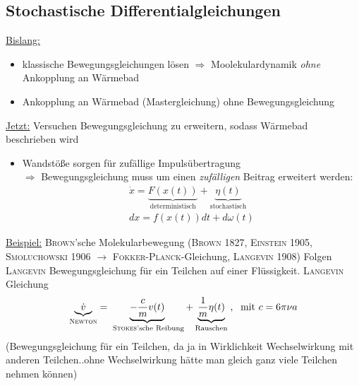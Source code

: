 \documentclass[12pt]{article}
\begin{document}
\subsection{Stochastische Differentialgleichungen}
\underline{Bislang:}
\begin{itemize}
\item klassische Bewegungsgleichungen lösen $\Rightarrow$ Moolekulardynamik \textit{ohne} Ankopplung an Wärmebad 
\item Ankopplung an Wärmebad (Mastergleichung) ohne Bewegungsgleichung
\end{itemize}
\underline{Jetzt:} Versuchen Bewegungsgleichung zu erweitern, sodass Wärmebad beschrieben wird
 \begin{itemize}
 \item Wandstöße sorgen für zufällige Impulsübertragung \\
 $\Rightarrow$ Bewegungsgleichung muss um einen \textit{zufälligen} Beitrag erweitert werden:
 \begin{align}
 \dot{x} =\underbrace{ F(x(t))}_\text{deterministisch} +\underbrace{ \eta (t)}_\text{stochastisch} \\
 dx = f(x(t))dt + d\omega(t)
 \end{align}
  \end{itemize}
\underline{Beispiel:} \textsc{Brown}'sche Molekularbewegung (\textsc{Brown} 1827, \textsc{Einstein} 1905, \textsc{Smoluchowski} 1906 $\to$ \textsc{Fokker-Planck}-Gleichung, \textsc{Langevin} 1908) 
Folgen \textsc{Langevin} Bewegungsgleichung für ein Teilchen auf einer Flüssigkeit. \textsc{Langevin} Gleichung 
\begin{align}
\underbrace{\dot{v}}_\textsc{Newton}= \underbrace{-\frac{c}{m} v(t)}_\text{ \textsc{Stokes}'sche Reibung} + \underbrace{\frac{1}{m}\eta (t)}_\text{Rauschen} \; , \; \mbox{ mit } c= 6 \pi \nu a
\end{align} (Bewegungsgleichung für ein Teilchen, da ja in Wirklichkeit Wechselwirkung mit anderen Teilchen..ohne Wechselwirkung hätte man gleich ganz viele Teilchen nehmen können)
\end{document}
